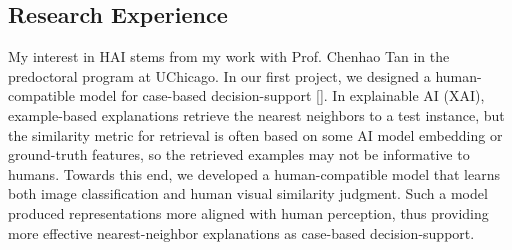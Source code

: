 \subsection*{Research Experience}









My interest in HAI stems from my work with Prof. Chenhao Tan in the predoctoral program at UChicago. In our first project, we designed a human-compatible model for case-based decision-support
[]. 
In explainable AI (XAI), example-based explanations retrieve the nearest neighbors to a test instance, but the similarity metric for retrieval is often based on some AI model embedding or ground-truth features, so the retrieved examples may not be informative to humans. 
Towards this end, we developed a human-compatible model that learns both image classification and human visual similarity judgment. Such a model produced representations more aligned with human perception, thus providing more effective nearest-neighbor explanations as case-based decision-support.



